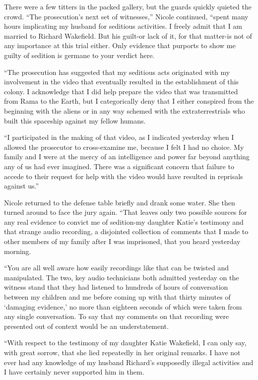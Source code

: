 \documentclass[]{article}
\begin{document}
{{There were a few titters in the packed gallery, but the guards quickly quieted the crowd.  “The prosecution’s next set of witnesses,” Nicole continued, “spent many hours implicating my husband for seditious activities.  I freely admit that I am married to Richard Wakefield.  But his guilt-or lack of it, for that matter-is not of any importance at this trial either.  Only evidence that purports to show me guilty of sedition is germane to your verdict here.

“The prosecution has suggested that my seditious acts originated with my involvement in the video that eventually resulted in the establishment of this colony.  I acknowledge that I did help prepare the video that was transmitted from Rama to the Earth, but I categorically deny that I either conspired from the beginning with the aliens or in any way schemed with the extraterrestrials who built this spaceship against my fellow humans.

“I participated in the making of that video, as I indicated yesterday when I allowed the prosecutor to cross-examine me, because I felt I had no choice.  My family and I were at the mercy of an intelligence and power far beyond anything any of us had ever imagined.  There was a significant concern that failure to accede to their request for help with the video would have resulted in reprisals against us.”

Nicole returned to the defense table briefly and drank some water.  She then turned around to face the jury again.  “That leaves only two possible sources for any real evidence to convict me of sedition-my daughter Katie’s testimony and that strange audio recording, a disjointed collection of comments that I made to other members of my family after I was imprisoned, that you heard yesterday morning.

“You are all well aware how easily recordings like that can be twisted and manipulated.  The two, key audio technicians both admitted yesterday on the witness stand that they had listened to hundreds of hours of conversation between my children and me before coming up with that thirty minutes of ‘damaging evidence,’ no more than eighteen seconds of which were taken from any single conversation.  To say that my comments on that recording were presented out of context would be an understatement.

“With respect to the testimony of my daughter Katie Wakefield, I can only say, with great sorrow, that she lied repeatedly in her original remarks.  I have not ever had any knowledge of my husband Richard’s supposedly illegal activities and I have certainly never supported him in them.

}}
\end{document}
